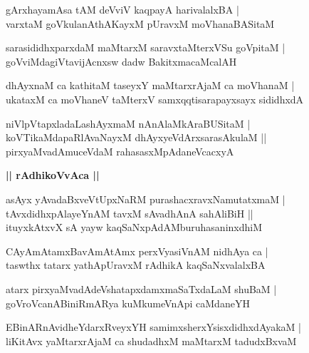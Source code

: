 \documentclass[twoside,12pt,openright]{book}
\newcounter{shloka}[chapter]
\def\uvaca#1{\centerline{{\large\textbf{#1}}}}
\begin{document}
\begin{shloka}%
gArxhayamAsa tAM deVviV kaqpayA harivalalxBA |\\
varxtaM goVkulanAthAKayxM pUravxM moVhanaBASitaM 
\end{shloka}


\begin{shloka}%
sarasididhxparxdaM maMtarxM saravxtaMterxVSu goVpitaM |\\
goVviMdagiVtavijAcnxsw dadw BakitxmacaMcalAH 
\end{shloka}

\begin{shloka}%
dhAyxnaM ca kathitaM taseyxY maMtarxrAjaM ca moVhanaM |\\
ukataxM ca moVhaneV taMterxV samxqqtisarapayxsayx sididhxdA 
\end{shloka}

\begin{shloka}%
niVlpVtapxladaLashAyxmaM nAnAlaMkAraBUSitaM |\\
koVTikaMdapaRlAvaNayxM dhAyxyeVdArxsarasAkulaM ||\\
pirxyaMvadAmuceVdaM rahasasxMpAdaneVcacxyA 
\end{shloka}

\uvaca{|| rAdhikoVvAca ||}

\begin{shloka}%
asAyx yAvadaBxveVtUpxNaRM purashacxravxNamutatxmaM |\\
tAvxdidhxpAlayeYnAM tavxM sAvadhAnA sahAliBiH ||\\
ituyxkAtxvX sA yayw kaqSaNxpAdAMburuhasaninxdhiM 
\end{shloka}

\begin{shloka}%
CAyAmAtamxBavAmAtAmx perxVyasiVnAM nidhAya ca |\\
taswthx tatarx yathApUravxM rAdhikA kaqSaNxvalalxBA 
\end{shloka}

\begin{shloka}%
atarx pirxyaMvadAdeVshatapxdamxmaSaTxdaLaM shuBaM |\\
goVroVcanABiniRmARya kuMkumeVnApi caMdaneYH
\end{shloka}

\begin{shloka}%
EBinARnAvidheYdarxRveyxYH samimxsherxYsisxdidhxdAyakaM |\\
liKitAvx yaMtarxrAjaM ca shudadhxM maMtarxM tadudxBxvaM 
\end{shloka}
\end{document}
